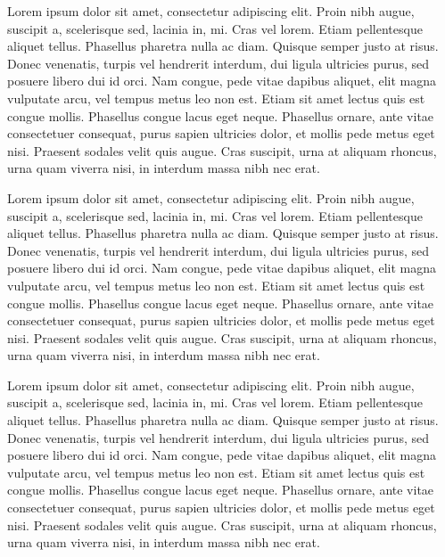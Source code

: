 \documentclass[12pt,a4paper]{article}
\begin{document}
  
  
  Lorem ipsum dolor sit amet, consectetur adipiscing elit. Proin nibh augue, suscipit a, scelerisque sed, lacinia in, mi. Cras vel lorem. Etiam pellentesque aliquet tellus. Phasellus pharetra nulla ac diam. Quisque semper justo at risus. Donec venenatis, turpis vel hendrerit interdum, dui ligula ultricies purus, sed posuere libero dui id orci. Nam congue, pede vitae dapibus aliquet, elit magna vulputate arcu, vel tempus metus leo non est. Etiam sit amet lectus quis est congue mollis. Phasellus congue lacus eget neque. Phasellus ornare, ante vitae consectetuer consequat, purus sapien ultricies dolor, et mollis pede metus eget nisi. Praesent sodales velit quis augue. Cras suscipit, urna at aliquam rhoncus, urna quam viverra nisi, in interdum massa nibh nec erat.
  
    \begin{doublespace}
  Lorem ipsum dolor sit amet, consectetur adipiscing elit. Proin nibh augue, suscipit a, scelerisque sed, lacinia in, mi. Cras vel lorem. Etiam pellentesque aliquet tellus. Phasellus pharetra nulla ac diam. Quisque semper justo at risus. Donec venenatis, turpis vel hendrerit interdum, dui ligula ultricies purus, sed posuere libero dui id orci. Nam congue, pede vitae dapibus aliquet, elit magna vulputate arcu, vel tempus metus leo non est. Etiam sit amet lectus quis est congue mollis. Phasellus congue lacus eget neque. Phasellus ornare, ante vitae consectetuer consequat, purus sapien ultricies dolor, et mollis pede metus eget nisi. Praesent sodales velit quis augue. Cras suscipit, urna at aliquam rhoncus, urna quam viverra nisi, in interdum massa nibh nec erat.
  \end{doublespace}
  
  Lorem ipsum dolor sit amet, consectetur adipiscing elit. Proin nibh augue, suscipit a, scelerisque sed, lacinia in, mi. Cras vel lorem. Etiam pellentesque aliquet tellus. Phasellus pharetra nulla ac diam. Quisque semper justo at risus. Donec venenatis, turpis vel hendrerit interdum, dui ligula ultricies purus, sed posuere libero dui id orci. Nam congue, pede vitae dapibus aliquet, elit magna vulputate arcu, vel tempus metus leo non est. Etiam sit amet lectus quis est congue mollis. Phasellus congue lacus eget neque. Phasellus ornare, ante vitae consectetuer consequat, purus sapien ultricies dolor, et mollis pede metus eget nisi. Praesent sodales velit quis augue. Cras suscipit, urna at aliquam rhoncus, urna quam viverra nisi, in interdum massa nibh nec erat.
  
\end{document}
